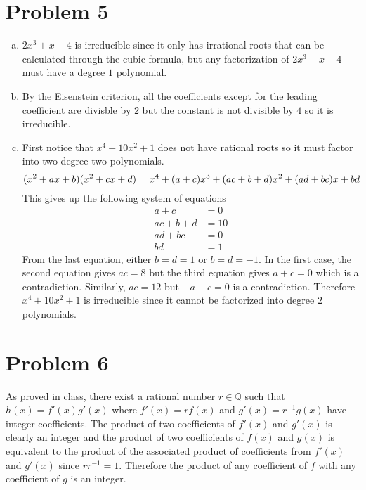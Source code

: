 \documentclass{article}
\begin{document}
\section*{Problem 5}
\begin{enumerate}[(a)]
    \item $2x^3 + x -4$ is irreducible since it only has irrational roots 
    that can be calculated through the cubic formula,
    but any factorization of $2x^3+x-4$ must have a degree $1$ polynomial.
    \item By the Eisenstein criterion, all the coefficients 
    except for the leading coefficient are divisble by $2$ but the constant
    is not divisible by $4$ so it is irreducible.
    \item First notice that $x^4+10x^2+1$ does not have rational roots 
    so it must factor into two degree two polynomials.
    \[
        (x^2+ax+b)(x^2+cx+d) = x^4 +(a+c)x^3 + (ac+b+d)x^2+(ad+bc)x + bd \\
    \]
    This gives up the following system of equations 
    \begin{align*}
        a+c &= 0 \\
        ac+b+d &= 10 \\
        ad+bc &= 0 \\
        bd &= 1 
    \end{align*}
    From the last equation, either $b=d=1$ or $b=d=-1$.
    In the first case, the second equation gives $ac=8$
    but the third equation gives $a+c=0$ which is a contradiction.
    Similarly, $ac=12$ but $-a-c=0$ is a contradiction.
    Therefore $x^4+10x^2+1$ is irreducible since it cannot be factorized
    into degree $2$ polynomials. 
\end{enumerate}
\newpage
\section*{Problem 6}
As proved in class, there exist a rational number $r \in \mathbb{Q}$
such that $h(x) = f'(x)g'(x)$ where $f'(x) = rf(x)$ and $g'(x) = r^{-1}g(x)$
have integer coefficients. 
The product of two coefficients of $f'(x)$ and $g'(x)$ is clearly an integer
and the product of two coefficients of $f(x)$ and $g(x)$ is equivalent to the 
product of the associated product of coefficients from $f'(x)$ and $g'(x)$
since $rr^{-1} = 1$.
Therefore the product of any coefficient of $f$ with any coefficient of $g$ is an integer.
\end{document}
